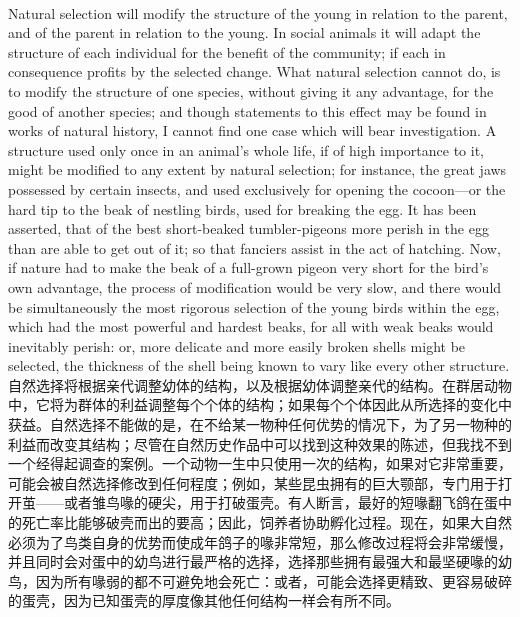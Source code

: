 \documentclass{article}
\begin{document}
\\
Natural selection will modify the structure of the young in relation to the parent, and of the parent in relation to the young. In social animals it will adapt the structure of each individual for the benefit of the community; if each in consequence profits by the selected change. What natural selection cannot do, is to modify the structure of one species, without giving it any advantage, for the good of another species; and though statements to this effect may be found in works of natural history, I cannot find one case which will bear investigation. A structure used only once in an animal’s whole life, if of high importance to it, might be modified to any extent by natural selection; for instance, the great jaws possessed by certain insects, and used exclusively for opening the cocoon—or the hard tip to the beak of nestling birds, used for breaking the egg. It has been asserted, that of the best short-beaked tumbler-pigeons more perish in the egg than are able to get out of it; so that fanciers assist in the act of hatching. Now, if nature had to make the beak of a full-grown pigeon very short for the bird’s own advantage, the process of modification would be very slow, and there would be simultaneously the most rigorous selection of the young birds within the egg, which had the most powerful and hardest beaks, for all with weak beaks would inevitably perish: or, more delicate and more easily broken shells might be selected, the thickness of the shell being known to vary like every other structure.\\
自然选择将根据亲代调整幼体的结构，以及根据幼体调整亲代的结构。在群居动物中，它将为群体的利益调整每个个体的结构；如果每个个体因此从所选择的变化中获益。自然选择不能做的是，在不给某一物种任何优势的情况下，为了另一物种的利益而改变其结构；尽管在自然历史作品中可以找到这种效果的陈述，但我找不到一个经得起调查的案例。一个动物一生中只使用一次的结构，如果对它非常重要，可能会被自然选择修改到任何程度；例如，某些昆虫拥有的巨大颚部，专门用于打开茧——或者雏鸟喙的硬尖，用于打破蛋壳。有人断言，最好的短喙翻飞鸽在蛋中的死亡率比能够破壳而出的要高；因此，饲养者协助孵化过程。现在，如果大自然必须为了鸟类自身的优势而使成年鸽子的喙非常短，那么修改过程将会非常缓慢，并且同时会对蛋中的幼鸟进行最严格的选择，选择那些拥有最强大和最坚硬喙的幼鸟，因为所有喙弱的都不可避免地会死亡：或者，可能会选择更精致、更容易破碎的蛋壳，因为已知蛋壳的厚度像其他任何结构一样会有所不同。\\
\end{document}
